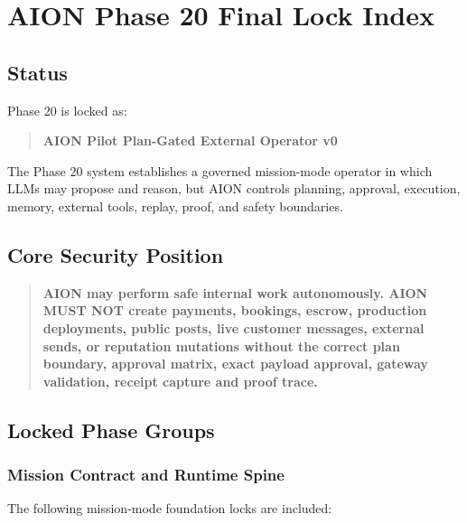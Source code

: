 \section{AION Phase 20 Final Lock Index}
\label{sec:aion-phase20-final-lock-index}

\subsection{Status}

Phase 20 is locked as:

\begin{quote}
\textbf{AION Pilot Plan-Gated External Operator v0}
\end{quote}

The Phase 20 system establishes a governed mission-mode operator in which LLMs may propose and reason, but AION controls planning, approval, execution, memory, external tools, replay, proof, and safety boundaries.

\subsection{Core Security Position}

\begin{quote}
\textbf{AION may perform safe internal work autonomously. AION MUST NOT create payments, bookings, escrow, production deployments, public posts, live customer messages, external sends, or reputation mutations without the correct plan boundary, approval matrix, exact payload approval, gateway validation, receipt capture and proof trace.}
\end{quote}

\subsection{Locked Phase Groups}

\subsubsection{Mission Contract and Runtime Spine}

The following mission-mode foundation locks are included:

